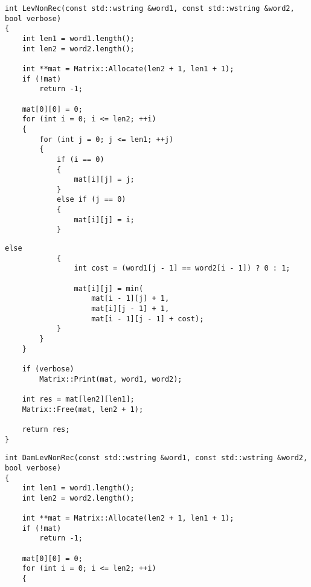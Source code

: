 \begin{lstlisting}[caption=Матричный алгоритм поиска расстояния Левенштейна (часть 1)]
int LevNonRec(const std::wstring &word1, const std::wstring &word2, bool verbose)
{
    int len1 = word1.length();
    int len2 = word2.length();

    int **mat = Matrix::Allocate(len2 + 1, len1 + 1);
    if (!mat)
        return -1;

    mat[0][0] = 0;
    for (int i = 0; i <= len2; ++i)
    {
        for (int j = 0; j <= len1; ++j)
        {
            if (i == 0)
            {
                mat[i][j] = j;
            }
            else if (j == 0)
            {
                mat[i][j] = i;
            }
\end{lstlisting}

\clearpage
\begin{lstlisting}[caption=Матричный алгоритм поиска расстояния Левенштейна (часть 2)]
            else
            {
                int cost = (word1[j - 1] == word2[i - 1]) ? 0 : 1;

                mat[i][j] = min(
                    mat[i - 1][j] + 1,
                    mat[i][j - 1] + 1,
                    mat[i - 1][j - 1] + cost);
            }
        }
    }

    if (verbose)
        Matrix::Print(mat, word1, word2);

    int res = mat[len2][len1];
    Matrix::Free(mat, len2 + 1);

    return res;
}
\end{lstlisting}

\begin{lstlisting}[caption=Матричный алгоритм поиска расстояния Дамерау~---~Левенштейна (часть 1)]
int DamLevNonRec(const std::wstring &word1, const std::wstring &word2, bool verbose)
{
    int len1 = word1.length();
    int len2 = word2.length();

    int **mat = Matrix::Allocate(len2 + 1, len1 + 1);
    if (!mat)
        return -1;

    mat[0][0] = 0;
    for (int i = 0; i <= len2; ++i)
    {
\end{lstlisting}

